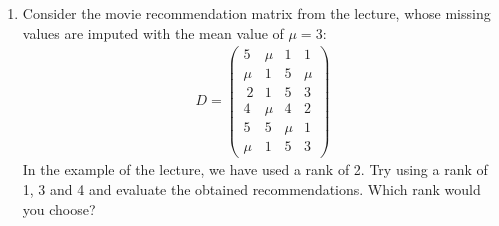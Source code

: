 \documentclass[letterpaper,10pt,english]{jupyterBook}
\begin{document}
\begin{enumerate}
\begin{sphinxuseclass}{toggle}
\sphinxAtStartPar
The truncated SVD yields:
\begin{align*}
 U_{\cdot \{1,2\}} \Sigma_{\{1,2\}\{1,2\}} V_{\cdot \{1,2\}}^\top=
\begin{pmatrix}
0.4 & -0.4\\
0.4 & -0.4\\
0.4 & -0.4\\
0.3 & 0.5\\
0.3 & 0.5\\
0.6 & 0.1
\end{pmatrix}
\begin{pmatrix}
16.8 & 0\\  
0 & 8.8
\end{pmatrix}
\begin{pmatrix}
0.6 & 0.6 & 0.4 & 0.4\\
-0.4 & -0.4 & 0.6 & 0.6
\end{pmatrix}
\end{align*}
\sphinxAtStartPar
We  see that the decomposition of SVD is quite different  from the one in Eq.\textasciitilde{}\textbackslash{}eqref\{eq:patternDecomp\}. The first pattern \(V_{\cdot 1}\) indicates more general information of the data, like movie popularity. Since there are more users who like movies 1 and 2 than users who like movies 3 and 4, movies 1 and 2 get a slightly higher score of 0.6 (vs. 0.4) in the first pattern \(V_{\cdot 1}\). The second pattern \(V_{\cdot 2}\) indicates the duality in taste of movies  1,2 and 3,4 by the sign (\sphinxhyphen{}0.4 vs. 0.6). Likewise, we recognize the difference between users in the matrix \(U\). There are three user patterns: \((0.4, -0.4)\), \((0.3,0.5)\) and \((0.6,0.1)\).

\end{sphinxuseclass}
\item {} 
\sphinxAtStartPar
Consider the movie recommendation matrix from the lecture, whose missing values are imputed with the mean value of \(\mu=3\):
\begin{align*}
         D=\begin{pmatrix}
        5 & \mu & 1 & 1 \\
        \mu & 1 & 5 & \mu  \\\
        2 & 1 & 5 & 3 \\
        4 & \mu & 4 & 2\\
        5 & 5 & \mu & 1 \\
        \mu & 1 & 5 & 3 
      \end{pmatrix}
    \end{align*}
\sphinxAtStartPar
In the example of the lecture, we have used a rank of 2. Try using a rank of 1, 3 and 4 and evaluate the obtained recommendations. Which rank would you choose?


\end{enumerate}
\end{document}
